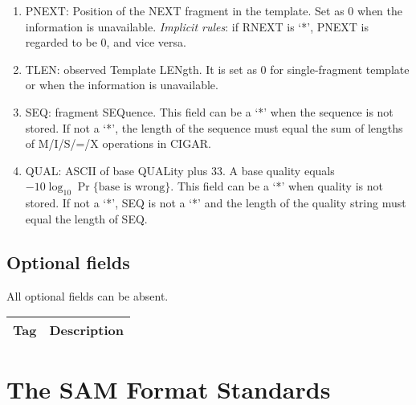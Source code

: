 \documentclass[10pt]{article}
\begin{document}
\begin{enumerate}
\item {\sf PNEXT}: Position of the NEXT fragment in the template. Set as
  0 when the information is unavailable. \emph{Implicit rules}: if {\sf
    RNEXT} is `*', {\sf PNEXT} is regarded to be 0, and vice versa.
\item {\sf TLEN}: observed Template LENgth. It is set as 0 for
  single-fragment template or when the information is unavailable.
\item {\sf SEQ}: fragment SEQuence. This field can be a `*' when the
  sequence is not stored. If not a `*', the length of the sequence must
  equal the sum of lengths of M/I/S/=/X operations in {\sf CIGAR}.
\item {\sf QUAL}: ASCII of base QUALity plus 33. A base quality equals
  $-10\log_{10}\Pr\{\mbox{base is wrong}\}$. This field can be a `*'
  when quality is not stored. If not a `*', {\sf SEQ} is not a `*' and
  the length of the quality string must equal the length of {\sf SEQ}.
\end{enumerate}

\subsection{Optional fields}
All optional fields can be absent.
\begin{center}
\begin{tabular}{ll}
\hline
{\bf Tag} & {\bf Description} \\
\hline
\hline
\end{tabular}
\end{center}

\section{The SAM Format Standards}
\end{document}
